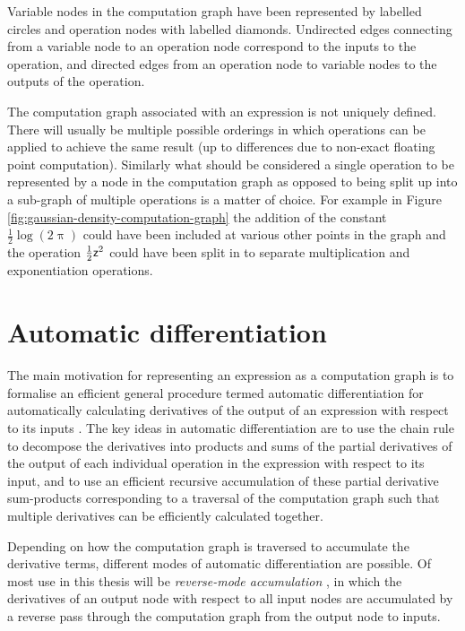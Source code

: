 Variable nodes in the computation graph have been represented by labelled circles and operation nodes with labelled diamonds. Undirected edges connecting from a variable node to an operation node correspond to the inputs to the operation, and directed edges from an operation node to variable nodes to the outputs of the operation.

The computation graph associated with an expression is not uniquely defined. There will usually be multiple possible orderings in which operations can be applied to achieve the same result (up to differences due to non-exact floating point computation). Similarly what should be considered a single operation to be represented by a node in the computation graph as opposed to being split up into a sub-graph of multiple operations is a matter of choice. For example in Figure \ref{fig:gaussian-density-computation-graph} the addition of the constant $\frac{1}{2}\log(2\uppi)$ could have been included at various other points in the graph and the operation $\frac{1}{2}\mathsf{z}^2$ could have been split in to separate multiplication and exponentiation operations.

\section{Automatic differentiation}\label{sec:automatic-differentiation}

The main motivation for representing an expression as a computation graph is to formalise an efficient general procedure termed automatic differentiation for automatically calculating derivatives of the output of an expression with respect to its inputs \citep{nolan1953analytical,beda1959programs}. The key ideas in automatic differentiation are to use the chain rule to decompose the derivatives into products and sums of the partial derivatives of the output of each individual operation in the expression with respect to its input, and to use an efficient recursive accumulation of these partial derivative sum-products corresponding to a traversal of the computation graph such that multiple derivatives can be efficiently calculated together.

Depending on how the computation graph is traversed to accumulate the derivative terms, different modes of automatic differentiation are possible. Of most use in this thesis will be \emph{reverse-mode accumulation} \citep{speelpenning1980compiling}, in which the derivatives of an output node with respect to all input nodes are accumulated by a reverse pass through the computation graph from the output node to inputs.

